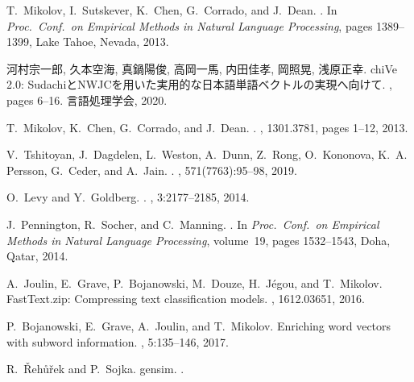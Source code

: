 \documentclass[12pt]{jarticle}
\begin{document}
%
%
\begin{thebibliography}{10}

T.~Mikolov, I.~Sutskever, K.~Chen, G.~Corrado, and J.~Dean.
.
\newblock In {\em Proc.~Conf.~on Empirical Methods in Natural Language Processing}, pages 1389--1399, Lake Tahoe, Nevada, 2013.

河村宗一郎, 久本空海, 真鍋陽俊, 高岡一馬, 内田佳孝, 岡照晃, 浅原正幸.
\newblock chiVe 2.0: SudachiとNWJCを用いた実用的な日本語単語ベクトルの実現へ向けて.
, pages 6--16. 言語処理学会, 2020.

T.~Mikolov, K.~Chen, G.~Corrado, and J.~Dean.
.
        , 1301.3781, pages 1--12, 2013.

V.~Tshitoyan, J.~Dagdelen, L.~Weston, A.~Dunn, Z.~Rong, O.~Kononova, K.~A. Persson, G.~Ceder, and A.~Jain.
.
, 571(7763):95--98, 2019.

O.~Levy and Y.~Goldberg. .
,
  3:2177--2185, 2014.

J.~Pennington, R.~Socher, and C.~Manning.
.
\newblock In {\em Proc.~Conf.~on Empirical Methods in
  Natural Language Processing}, volume~19, pages 1532--1543,
  Doha, Qatar, 2014.

A.~Joulin, E.~Grave, P.~Bojanowski, M.~Douze, H.~J{\'e}gou, and T.~Mikolov.
\newblock FastText.zip: Compressing text classification models.
, 1612.03651, 2016.

P.~Bojanowski, E.~Grave, A.~Joulin, and T.~Mikolov.
\newblock Enriching word vectors with subword information.
, 5:135--146, 2017.

R.~{\v R}eh{\r u}{\v r}ek and P.~Sojka.
\newblock gensim.
.


\end{thebibliography}
\end{document}
